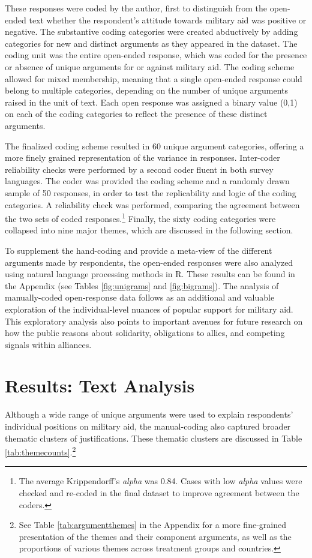 These responses were coded by the author, first to distinguish from the open-ended text whether the respondent's attitude towards military aid was positive or negative. The substantive coding categories were created abductively by adding categories for new and distinct arguments as they appeared in the dataset.\autocite{krippendorff_content_2019} The coding unit was the entire open-ended response, which was coded for the presence or absence of unique arguments for or against military aid. The coding scheme allowed for mixed membership, meaning that a single open-ended response could  belong to multiple categories, depending on the number of unique arguments raised in the unit of text. Each open response was assigned a binary value (0,1) on each of the coding categories to reflect the presence of these distinct arguments.

The finalized coding scheme resulted in 60 unique argument categories, offering a more finely grained representation of the variance in responses. Inter-coder reliability checks were performed by a second coder fluent in both survey languages. The coder was provided the coding scheme and a randomly drawn sample of 50 responses, in order to test the replicability and logic of the coding categories. A reliability check was performed, comparing the agreement between the two sets of coded responses.\footnote{The average Krippendorff's \textit{alpha} was 0.84. Cases with low \textit{alpha} values were checked and re-coded in the final dataset to improve agreement between the coders.} Finally, the sixty coding categories were collapsed into nine major themes, which are discussed in the following section. 

To supplement the hand-coding and provide a meta-view of the different arguments made by respondents, the open-ended responses were also analyzed using natural language processing methods in R. These results can be found in the Appendix (see Tables \ref{fig:unigrams} and \ref{fig:bigrams}). The analysis of manually-coded open-response data follows as an additional and valuable exploration of the individual-level nuances of popular support for military aid. This exploratory analysis also points to important avenues for future research on how the public reasons about solidarity, obligations to allies, and competing signals within alliances.  

\section{Results: Text Analysis} 
Although a wide range of unique arguments were used to explain respondents' individual positions on military aid, the manual-coding also captured broader thematic clusters of justifications. These thematic clusters are discussed in Table \ref{tab:themecounts}.\footnote{See Table \ref{tab:argumentthemes} in the Appendix for a more fine-grained presentation of the themes and their component arguments, as well as the proportions of various themes across treatment groups and countries.} 

